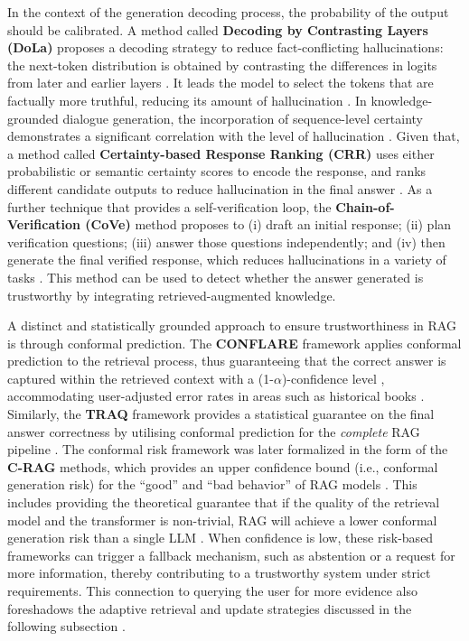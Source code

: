 \documentclass[11pt]{article}
\begin{document}
In the context of the generation decoding process, the probability of the output should be calibrated. A method called \textbf{Decoding by Contrasting Layers (DoLa)} proposes a decoding strategy to reduce fact-conflicting hallucinations: the next-token distribution is obtained by contrasting the differences in logits from later and earlier layers \cite{ref181}. It leads the model to select the tokens that are factually more truthful, reducing its amount of hallucination \cite{ref181}. In knowledge-grounded dialogue generation, the incorporation of sequence-level certainty demonstrates a significant correlation with the level of hallucination \cite{ref182}. Given that, a method called \textbf{Certainty-based Response Ranking (CRR)} uses either probabilistic or semantic certainty scores to encode the response, and ranks different candidate outputs to reduce hallucination in the final answer \cite{ref182}. As a further technique that provides a self-verification loop, the \textbf{Chain-of-Verification (CoVe)} method proposes to (i) draft an initial response; (ii) plan verification questions; (iii) answer those questions independently; and (iv) then generate the final verified response, which reduces hallucinations in a variety of tasks \cite{ref183}. This method can be used to detect whether the answer generated is trustworthy by integrating retrieved-augmented knowledge.

A distinct and statistically grounded approach to ensure trustworthiness in RAG is through conformal prediction. The \textbf{CONFLARE} framework applies conformal prediction to the retrieval process, thus guaranteeing that the correct answer is captured within the retrieved context with a (1-\(\alpha\))-confidence level \cite{ref184}, accommodating user-adjusted error rates in areas such as historical books \cite{ref184}. Similarly, the \textbf{TRAQ} framework provides a statistical guarantee on the final answer correctness by utilising conformal prediction for the \emph{complete} RAG pipeline \cite{ref185}. The conformal risk framework was later formalized in the form of the \textbf{C-RAG} methods, which provides an upper confidence bound (i.e., conformal generation risk) for the ``good'' and ``bad behavior'' of RAG models \cite{ref186}. This includes providing the theoretical guarantee that if the quality of the retrieval model and the transformer is non-trivial, RAG will achieve a lower conformal generation risk than a single LLM \cite{ref186}. When confidence is low, these risk-based frameworks can trigger a fallback mechanism, such as abstention or a request for more information, thereby contributing to a trustworthy system under strict requirements. This connection to querying the user for more evidence also foreshadows the adaptive retrieval and update strategies discussed in the following subsection \cite{ref187}.
\end{document}
